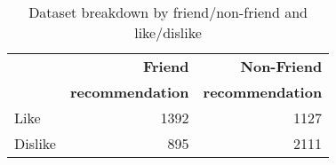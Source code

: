 \begin{table}
\centering
\begin{tabular}{|>{\small}l|>{\small}r|>{\small}r|}\hline
&\textbf{Friend}  & \textbf{Non-Friend} \\
&\textbf{recommendation}  & \textbf{recommendation} \\
\hline
Like& 1392 & 1127 \\
\hline
Dislike& 895 & 2111\\
\hline
\end{tabular}
\caption{Dataset breakdown by friend/non-friend and like/dislike}
\label{tab:likeinfo}
\end{table}

